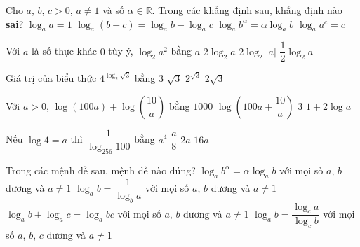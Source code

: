 \begin{ex}%
	Cho $a$, $b$, $c>0$, $a\ne 1$ và số $\alpha \in\mathbb{R}$. Trong các khẳng định sau, khẳng  định nào \textbf{sai}?
	\choice 
		 {$\log_aa=1$}
		 {\True $\log_a(b-c)=\log_ab-\log_ac$}
		{$\log_ab^\alpha=\alpha\log_ab$} 
		 {$\log_aa^c=c$}
\end{ex}

\begin{ex}%
	Với $ a$ là số thực khác $0$ tùy  ý, $\log_2a^2$ bằng
	\choice 
		 {$a$}
		 {$2\log_2a$}
		{\True $2\log_2|a|$} 
		 {$\dfrac{1}{2}\log_2a$}
\end{ex}

\begin{ex}%
	Giá trị  của biểu thức $4^{\log_2\sqrt{3}}$ bằng
	\choice 
		{\True $3$} 
		{$\sqrt{3}$} 
		{$2^{\sqrt{3}}$} 
		{$2\sqrt{3}$} 
\end{ex}

\begin{ex}%
	Với $a>0$, $\log(100a) + \log\left(\dfrac{10}{a}\right)$ bằng 
	\choice 
		{$1000$} 
		{$\log\left(100a+\dfrac{10}{a}\right)$} 
		 {\True $3$}
		{$1+2\log a$} 
\end{ex}

\begin{ex}%
	Nếu $\log 4=a$ thì $\dfrac{1}{\log_{256}100}$  bằng
	 \choice
		 {$a^4$}
		 {$\dfrac{a}{8}$}
		{\True  $ 2a$}
		{$ 16a$} 
\end{ex}

\begin{ex}%
	Trong các mệnh  đề sau, mệnh đề nào đúng?
	 \choice
		{\True $\log _a b^\alpha=\alpha \log _a b$ với mọi số $a$, $b$  dương và $a \neq 1$}
		{$\log _a b=\dfrac{1}{\log _b a}$ với mọi số $a$, $b$ dương và $a  \neq 1$}
		{$\log _a b+\log _a c=\log _a b  c$ với mọi số $a$, $b$ dương và $a \neq 1$}
		{$\log _a b=\dfrac{\log _c a}{\log _c b}$  với mọi số $a$, $b$, $c$ dương và $a \neq 1$}
\end{ex}

